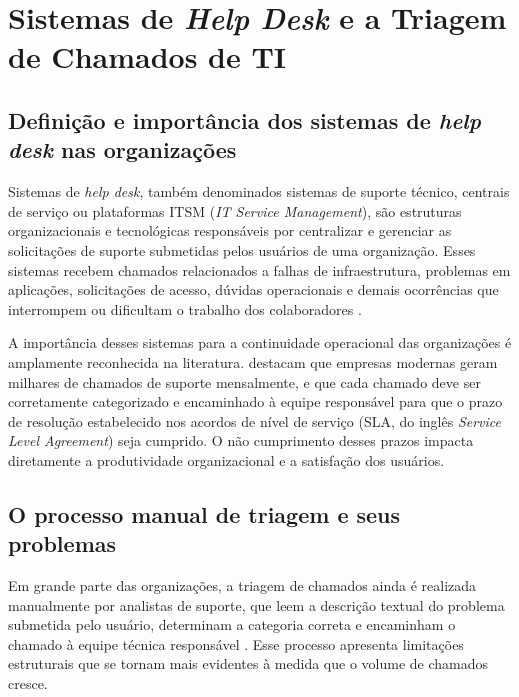 \documentclass[
    12pt,                %
    openright,           %
    oneside,             %
    a4paper,             %
    english,             %
    brazil               %
]{abntex2}
\begin{document}
\section{Sistemas de \textit{Help Desk} e a Triagem de Chamados de TI}
\label{sec:helpdesk}

\subsection{Definição e importância dos sistemas de \textit{help desk} nas organizações}
\label{subsec:helpdesk_definicao}

Sistemas de \textit{help desk}, também denominados sistemas de suporte técnico, centrais de serviço ou plataformas ITSM (\textit{IT Service Management}), são estruturas organizacionais e tecnológicas responsáveis por centralizar e gerenciar as solicitações de suporte submetidas pelos usuários de uma organização. Esses sistemas recebem chamados relacionados a falhas de infraestrutura, problemas em aplicações, solicitações de acesso, dúvidas operacionais e demais ocorrências que interrompem ou dificultam o trabalho dos colaboradores \cite{zemp2021}.

A importância desses sistemas para a continuidade operacional das organizações é amplamente reconhecida na literatura.  destacam que empresas modernas geram milhares de chamados de suporte mensalmente, e que cada chamado deve ser corretamente categorizado e encaminhado à equipe responsável para que o prazo de resolução estabelecido nos acordos de nível de serviço (SLA, do inglês \textit{Service Level Agreement}) seja cumprido. O não cumprimento desses prazos impacta diretamente a produtividade organizacional e a satisfação dos usuários.

\subsection{O processo manual de triagem e seus problemas}
\label{subsec:helpdesk_triagem}

Em grande parte das organizações, a triagem de chamados ainda é realizada manualmente por analistas de suporte, que leem a descrição textual do problema submetida pelo usuário, determinam a categoria correta e encaminham o chamado à equipe técnica responsável \cite{zemp2021}. Esse processo apresenta limitações estruturais que se tornam mais evidentes à medida que o volume de chamados cresce.
\end{document}
